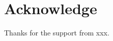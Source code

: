 \clearpage
\section*{Acknowledge}
\label{sec:acknowledge-acknowledge}

Thanks for the support from xxx.
